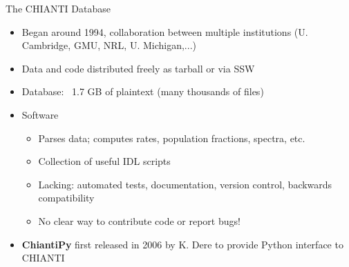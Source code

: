 \documentclass[12pt,aspectratio=169]{beamer}
\begin{document}
\begin{frame}{The CHIANTI Database}
    \begin{itemize}
        \item Began around 1994, collaboration between multiple institutions (U. Cambridge, GMU, NRL, U. Michigan,...)
        \item Data and code distributed freely as tarball or via SSW
        \item Database: ~1.7 GB of plaintext (many thousands of files)
        \item Software
        \begin{itemize}
            \item Parses data; computes rates, population fractions, spectra, etc.
            \item Collection of useful IDL scripts
            \item Lacking: automated tests, documentation, version control, backwards compatibility
            \item \alert{No clear way to contribute code or report bugs!}
        \end{itemize}
        \item \textbf{ChiantiPy} first released in 2006 by K. Dere to provide Python interface to CHIANTI
    \end{itemize}
\end{frame}
\end{document}
